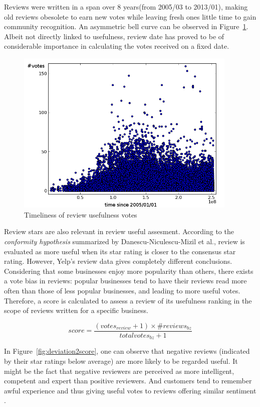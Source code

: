 \documentclass[a4paper,12pt,title]{article}
\begin{document}
Reviews were written in a span over 8 years(from 2005/03 to 2013/01), making old reviews obesolete to earn new votes while leaving fresh ones little time to gain community recognition. An asymmetric bell curve can be observed in Figure~\ref{fig:vote2date}. Albeit not directly linked to usefulness, review date has proved to be of considerable importance in calculating the votes received on a fixed date.

\begin{figure}
\centerline{\includegraphics[width=300pt]{graph/vote2date.png}}
\caption{Timeliness of review usefulness votes}
\label{fig:vote2date}
\end{figure}

Review stars are also relevant in review useful assesment. According to the \textit{conformity hypothesis} summarized by Danescu-Niculescu-Mizil et al.\cite{communityreceiveopinion}, review is evaluated as more useful when its star rating is closer to the consensus star rating. However, Yelp's review data gives completely different conclusions. Considering that some businesses enjoy more popularity than others, there exists a vote bias in reviews: popular businesses tend to have their reviews read more often than those of less popular businesses, and leading to more useful votes. Therefore, a score is calculated to assess a review of its usefulness ranking in the scope of reviews written for a specific business. 

$$score = \frac{(votes_{review}+1)\times \#reviews_{bz}}{total votes_{bz}+1}$$

 In Figure~\ref{fig:deviation2score}, one can observe that negative reviews (indicated by their star ratings below average) are more likely to be regarded useful. It might be the fact that negative reviewers are perceived as more intelligent, competent and expert than positive reviewers. And customers tend to remember awful experience and thus giving useful votes to reviews offering similar sentiment .
\end{document}
